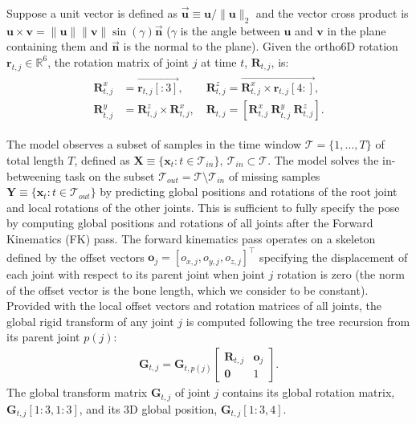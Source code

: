 \documentclass[letterpaper]{article} \usepackage[]{aaai23}  \usepackage{times}  \usepackage{helvet}  \usepackage{courier}  \usepackage[hyphens]{url}  \usepackage{graphicx} \urlstyle{rm} \def\UrlFont{\rm}  \usepackage{natbib}  \usepackage{caption} \frenchspacing  \setlength{\pdfpagewidth}{8.5in} \setlength{\pdfpageheight}{11in}
\renewcommand{\vec}[1]{\mathbf{#1}}
\renewcommand{\Re}{\mathbb{R}}
\begin{document}
Suppose a unit vector is defined as $\overrightarrow{\vec{u}} \equiv \vec{u} / \| \vec{u} \|_2$ and the vector cross product is $\vec{u} \times \vec{v} = \|\vec{u}\| \|\vec{v}\| \sin(\gamma) \overrightarrow{\vec{n}}$ ($\gamma$ is the angle between $\vec{u}$ and $\vec{v}$ in the plane containing them and $\overrightarrow{\vec{n}}$ is the normal to the plane). Given the ortho6D rotation $\vec{r}_{t,j} \in \Re^6$, the rotation matrix of joint $j$ at time $t$, $\vec{R}_{t,j}$, is: 
\begin{align} 
\begin{split} \nonumber
    \vec{R}_{t,j}^x &= \overrightarrow{\vec{r}_{t,j}[:3]}, \quad\quad
    \vec{R}_{t,j}^z = \overrightarrow{\vec{R}_{t,j}^x \times \vec{r}_{t,j}[4:]}, \\
    \vec{R}_{t,j}^y &= \vec{R}_{t,j}^z \times \vec{R}_{t,j}^x, \quad
    \vec{R}_{t,j} = \left[\vec{R}_{t,j}^x \   \vec{R}_{t,j}^y \  \vec{R}_{t,j}^z \right].
\end{split}
\end{align}



The model observes a subset of samples in the time window $\mathcal{T} = \{1, \ldots, T\}$ of total length $T$, defined as $\vec{X} \equiv \{ \vec{x}_t: t \in \mathcal{T}_{in} \}, \ \mathcal{T}_{in} \subset \mathcal{T}$. The model solves the in-betweening task on the subset $\mathcal{T}_{out} = \mathcal{T} \setminus \mathcal{T}_{in}$ of missing samples $\vec{Y} \equiv \{ \vec{x}_t: t \in \mathcal{T}_{out} \}$ by predicting global positions and rotations of the root joint and local rotations of the other joints. This is sufficient to fully specify the pose by computing global positions and rotations of all joints after the Forward Kinematics (FK) pass. The forward kinematics pass operates on a skeleton defined by the offset vectors $\vec{o}_j = [o_{x,j}, o_{y,j}, o_{z,j}]^\intercal$ specifying the displacement of each joint with respect to its parent joint when joint $j$ rotation is zero (the norm of the offset vector is the bone length, which we consider to be constant). Provided with the local offset vectors and rotation matrices of all joints, the global rigid transform of any joint $j$ is computed following the tree recursion from its parent joint $p(j)$:
\begin{align} \nonumber
\vec{G}_{t,j} = \vec{G}_{t,p(j)} \begin{bmatrix}
\vec{R}_{t,j} & \vec{o}_j \\
\vec{0} & 1
\end{bmatrix}.
\end{align}
The global transform matrix $\vec{G}_{t,j}$ of joint $j$ contains its global rotation matrix, $\vec{G}_{t,j}[1:3, 1:3]$, and its 3D global position, $\vec{G}_{t,j}[1:3, 4]$.
\end{document}
